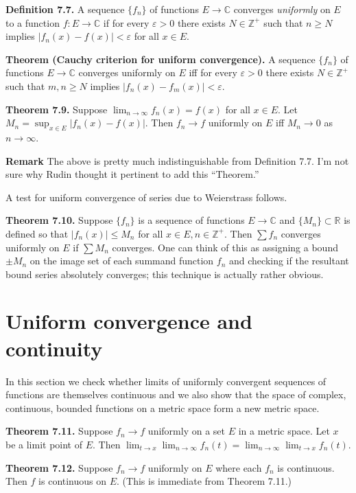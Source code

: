 \documentclass[a4paper]{article}
\newcommand{\C}{\mathbb{C}}
\newcommand{\R}{\mathbb{R}}
\newcommand{\Z}{\mathbb{Z}}
\begin{document}
\textbf{Definition 7.7.} A sequence $\{f_n\}$ of functions $E \to \C$ converges \emph{uniformly} on $E$ to a function $f : E \to \C$ if for every $\varepsilon > 0$ there exists $N \in \Z^+$ such that $n \geq N$ implies $|f_n(x) - f(x)| < \varepsilon$ for all $x \in E$.

\textbf{Theorem (Cauchy criterion for uniform convergence).} A sequence $\{f_n\}$ of functions $E \to \C$ converges uniformly on $E$ iff for every $\varepsilon > 0$ there exists $N \in \Z^+$ such that $m, n \geq N$ implies $|f_n(x) - f_m(x)| < \varepsilon$.

\textbf{Theorem 7.9.} Suppose $\displaystyle \lim_{n \to \infty} f_n(x) = f(x)$ for all $x \in E$. Let $\displaystyle M_n = \sup_{x \in E} |f_n(x) - f(x)|$. Then $f_n \to f$ uniformly on $E$ iff $M_n \to 0$ as $n \to \infty$.

\textbf{Remark} The above is pretty much indistinguishable from Definition 7.7. I'm not sure why Rudin thought it pertinent to add this ``Theorem.''

A test for uniform convergence of series due to Weierstrass follows.

\textbf{Theorem 7.10.} Suppose $\{f_n\}$ is a sequence of functions $E \to \C$ and $\{M_n\} \subset \R$ is defined so that $|f_n(x)| \leq M_n$ for all $x \in E, n \in \Z^+$. Then $\sum f_n$ converges uniformly on $E$ if $\sum M_n$ converges. One can think of this as assigning a bound $\pm M_n$ on the image set of each summand function $f_n$ and checking if the resultant bound series absolutely converges; this technique is actually rather obvious.

\section{Uniform convergence and continuity}

In this section we check whether limits of uniformly convergent sequences of functions are themselves continuous and we also show that the space of complex, continuous, bounded functions on a metric space form a new metric space.

\textbf{Theorem 7.11.} Suppose $f_n \to f$ uniformly on a set $E$ in a metric space. Let $x$ be a limit point of $E$. Then $\displaystyle \lim_{t \to x} \lim_{n \to \infty} f_n(t) = \lim_{n \to \infty} \lim_{t \to x} f_n(t)$.

\textbf{Theorem 7.12.} Suppose $f_n \to f$ uniformly on $E$ where each $f_n$ is continuous. Then $f$ is continuous on $E$. (This is immediate from Theorem 7.11.)
\end{document}
